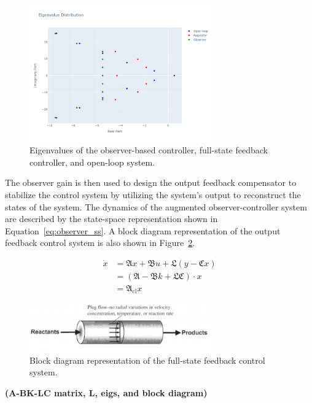 \begin{figure}[ht]
    \centering
    \includegraphics*[width=0.7\textwidth]{Figures/pole_placement.png}
    \caption{Eigenvalues of the observer-based controller, full-state feedback controller, and open-loop system.}
    \label{fig:eigs}
\end{figure}

The observer gain is then used to design the output feedback compensator to stabilize the control system by utilizing the system's output to reconstruct the states of the system. The dynamics of the augmented observer-controller system are described by the state-space representation shown in Equation~\ref{eq:observer_ss}. A block diagram representation of the output feedback control system is also shown in Figure~\ref{fig:block_diagram_observer}.

\begin{equation}
    \begin{aligned} \label{eq:observer_ss}
        \dot{x} &= \mathfrak{A} x + \mathfrak{B} u + \mathfrak{L} (y - \mathfrak{C} x) \\
        &= (\mathfrak{A} - \mathfrak{B} k + \mathfrak{L} \mathfrak{C}) \cdot x \\
        &= \mathfrak{A}_{\text{cl}} x
    \end{aligned}
\end{equation}

\begin{figure}
    \centering
    \includegraphics*[width=0.7\textwidth]{Figures/sample.jpeg}
    \caption{Block diagram representation of the full-state feedback control system.}
    \label{fig:block_diagram_observer}
\end{figure}

\textbf{(A-BK-LC matrix, L, eigs, and block diagram)} %
